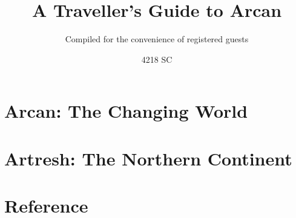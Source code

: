 \documentclass[letterpaper,twocolumn,openany,nodeprecatedcode]{dndbook}
\title{A Traveller's Guide to Arcan}
\author{Compiled for the convenience of registered guests}
\date{4218 SC}
\begin{document}
\frontmatter

\maketitle
\tableofcontents






\mainmatter

\part{Arcan: The Changing World}






\part{Artresh: The Northern Continent}






\appendix

\part{Reference}

\end{document}
